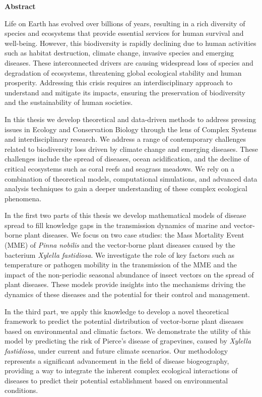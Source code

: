 \begin{center}
    \textbf{\Large Abstract}
\end{center}

Life on Earth has evolved over billions of years, resulting in a rich
diversity of species and ecosystems that provide essential services for
human survival and well-being. However, this biodiversity is rapidly
declining due to human activities such as habitat destruction, climate
change, invasive species and emerging diseases. These interconnected
drivers are causing widespread loss of species and degradation of
ecosystems, threatening global ecological stability and human prosperity.
Addressing this crisis requires an interdisciplinary approach to understand
and mitigate its impacts, ensuring the preservation of biodiversity and the
sustainability of human societies.

In this thesis we develop theoretical and data-driven methods
to address pressing issues in Ecology and Conservation Biology through the
lens of Complex Systems and interdisciplinary research. We address a
range of contemporary challenges related to biodiversity loss driven by
climate change and emerging diseases. These challenges include the spread
of diseases, ocean acidification, and the decline of critical ecosystems such
as coral reefs and seagrass meadows. We rely on a combination of theoretical
models, computational simulations, and advanced data analysis techniques to
gain a deeper understanding of these complex ecological phenomena.

In the first two parts of this thesis we develop mathematical models of
disease spread to fill knowledge gaps in the transmission dynamics of
marine and vector-borne plant diseases. We focus on two case studies: the
Mass Mortality Event (MME) of \textit{Pinna nobilis} and the vector-borne plant
diseases caused by the bacterium \textit{Xylella fastidiosa}. We investigate
the role of key factors such as temperature or pathogen mobility in the
transmission of the MME and the impact of the non-periodic seasonal abundance
of insect vectors on the spread of plant diseases. These models provide
insights into the mechanisms driving the dynamics of these diseases and the
potential for their control and management.

In the third part, we apply this knowledge to develop a novel
theoretical framework to predict the potential distribution of
vector-borne plant diseases based on environmental and climatic factors. We
demonstrate the utility of this model by predicting the risk of Pierce's
disease of grapevines, caused by \textit{Xylella fastidiosa}, under current
and future climate scenarios. Our methodology represents a significant
advancement in the field of disease biogeography, providing a way to
integrate the inherent complex ecological interactions of diseases to predict
their potential establishment based on environmental conditions.

